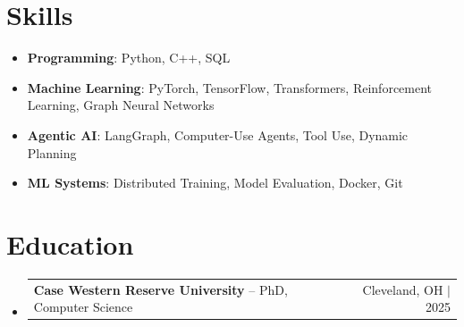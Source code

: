 \documentclass[letterpaper,13pt]{article}
\makeatletter
\newcommand{\resumeProjectHeading}[2]{
    \item
    \begin{tabular*}{\textwidth}{l@{\extracolsep{\fill}}r}
      \small#1 & #2 \\
    \end{tabular*}\vspace{-4pt}
}
\newcommand{\resumeSubHeadingListStart}{\begin{itemize}[leftmargin=0in, label={}]}
\newcommand{\resumeSubHeadingListEnd}{\end{itemize}}
\makeatother
\begin{document}
\section{Skills}
\vspace{0.02cm}
\begin{itemize}[leftmargin=0.15in, label={}, itemsep=2pt, topsep=1pt]
  \item \textbf{Programming}: Python, C++, SQL
  \item \textbf{Machine Learning}: PyTorch, TensorFlow, Transformers, Reinforcement Learning, Graph Neural Networks
  \item \textbf{Agentic AI}: LangGraph, Computer-Use Agents, Tool Use, Dynamic Planning
  \item \textbf{ML Systems}: Distributed Training, Model Evaluation, Docker, Git
\end{itemize}
\vspace{0.02cm}

\section{Education}
\resumeSubHeadingListStart
  \resumeProjectHeading{\textbf{Case Western Reserve University} -- PhD, Computer Science}{Cleveland, OH $|$ 2025}
\resumeSubHeadingListEnd
\end{document}
